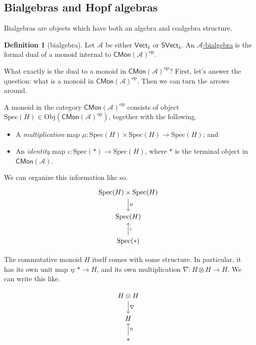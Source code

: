 \documentclass[a4paper,10pt]{scrreprt}
\newcommand{\defn}[1]{\ul{#1}}
\newcommand{\Obj}{\mathrm{Obj}}
\newcommand{\spec}{\mathrm{Spec}}
\theoremstyle{definition}
\newtheorem{definition}{Definition}[section]
\theoremstyle{plain}
\theoremstyle{remark}
\begin{document}
\subsection{Bialgebras and Hopf algebras}
Bialgebras are objects which have both an algebra and coalgebra structure. 
\begin{definition}[bialgebra]
  \label{def:bialgebra}
  Let $\mathscr{A}$ be either $\mathsf{Vect}_{k}$ or $\mathsf{SVect}_{k}$. An \defn{$\mathscr{A}$-bialgebra} is the formal dual of a monoid internal to $\mathsf{CMon}(\mathscr{A})^{\mathrm{op}}$. 
\end{definition}

What exactly is the dual to a monoid in $\mathsf{CMon}(\mathscr{A})^{\text{op}}$? First, let's answer the question: what is a monoid in $\mathsf{CMon}(\mathscr{A})^{\text{op}}$. Then we can turn the arrows around.

A monoid in the category $\mathsf{CMon}(\mathscr{A})^{\mathrm{op}}$ consists of object $\spec(H) \in \Obj(\mathsf{CMon}(\mathscr{A})^{\text{op}})$, together with the following.
\begin{itemize}
  \item A \emph{multiplication} map $\mu\colon \spec(H) \times \spec(H) \to \spec(H)$; and
  \item An \emph{identity} map $\iota\colon \spec(*) \to \spec(H)$, where $*$ is the terminal object in $\mathsf{CMon}(\mathscr{A})$.
\end{itemize}
We can organize this information like so.
\begin{equation*}
  \begin{tikzcd}
    \spec(H) \times \spec(H)
    \arrow[d, "\mu"]
    \\
    \spec(H) 
    \\
    \spec(*)
    \arrow[u, swap, "\iota"]
  \end{tikzcd}
\end{equation*}

The commutative monoid $H$ itself comes with some structure. In particular, it has its own unit map $\eta\colon * \to H$, and its own multiplication $\nabla\colon H \otimes H \to H$. We can write this like.

\begin{equation*}
  \begin{tikzcd}
    H \otimes H
    \arrow[d, "\nabla"]
    \\
    H
    \\
    *
    \arrow[u, swap, "\eta"]
  \end{tikzcd}
\end{equation*}
\end{document}
